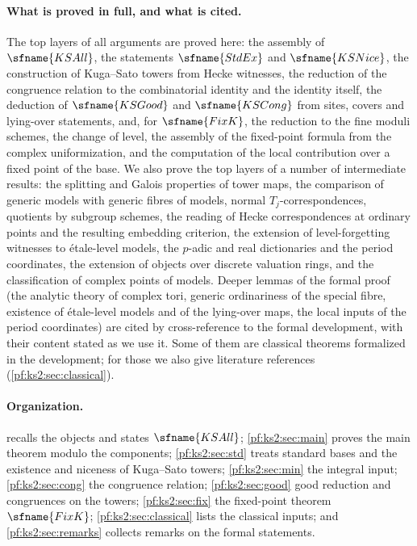 \paragraph{What is proved in full, and what is cited.}
The top layers of all arguments are proved here: the assembly of $\sfname{KSAll}$, the
statements $\sfname{StdEx}$ and $\sfname{KSNice}$, the construction of Kuga--Sato towers from
Hecke witnesses, the reduction of the congruence relation to the combinatorial identity and the
identity itself, the deduction of $\sfname{KSGood}$ and $\sfname{KSCong}$ from sites, covers and
lying-over statements, and, for $\sfname{FixK}$, the reduction to the fine moduli schemes, the
change of level, the assembly of the fixed-point formula from the complex uniformization, and the
computation of the local contribution over a fixed point of the base. We also prove the top
layers of a number of intermediate results: the splitting and Galois properties of tower maps,
the comparison of generic models with generic fibres of models, normal $T_j$-correspondences,
quotients by subgroup schemes, the reading of Hecke correspondences at ordinary points and the
resulting embedding criterion, the extension of level-forgetting witnesses to \'etale-level
models, the $p$-adic and real dictionaries and the period coordinates, the extension of objects
over discrete valuation rings, and the classification of complex points of models. Deeper lemmas of
the formal proof (the analytic theory of complex tori, generic ordinariness of the special fibre,
existence of \'etale-level models and of the lying-over maps, the local inputs of the period
coordinates) are cited by cross-reference
to the formal development, with their content stated as we use it. Some of them are classical theorems formalized in
the development; for those we also give literature references
(\cref{pf:ks2:sec:classical}).

\paragraph{Organization.}
 recalls the objects and states $\sfname{KSAll}$;
\cref{pf:ks2:sec:main} proves the main theorem modulo the components;
\cref{pf:ks2:sec:std} treats standard bases and the existence and niceness of Kuga--Sato towers;
\cref{pf:ks2:sec:min} the integral input; \cref{pf:ks2:sec:cong} the congruence relation;
\cref{pf:ks2:sec:good} good reduction and congruences on the towers; \cref{pf:ks2:sec:fix} the
fixed-point theorem $\sfname{FixK}$; \cref{pf:ks2:sec:classical} lists the classical inputs; and
\cref{pf:ks2:sec:remarks} collects remarks on the formal statements.


